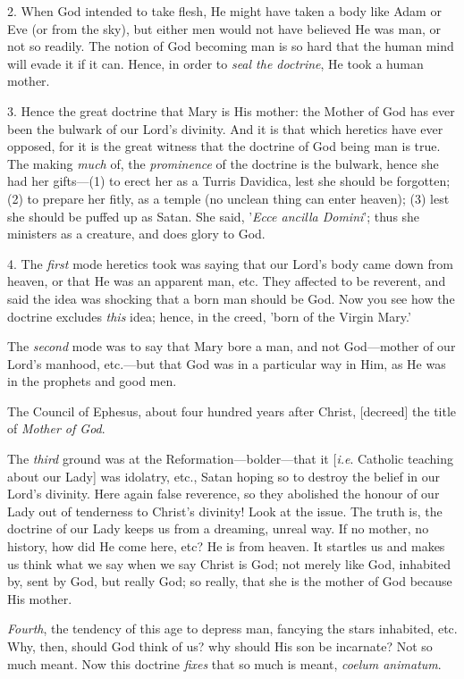 2. When God intended to take flesh, He might have
taken a body like Adam or Eve (or from the sky), but either men would
not have believed He was man, or not so readily. The notion of God
becoming man is so hard that the human mind will evade it if it can.
Hence, in order to \emph{seal the doctrine}, He took a human mother.

3. Hence the great doctrine that Mary is His
mother: the Mother of God has ever been the bulwark of our Lord's
divinity. And it is that which heretics have ever opposed, for it is
the great witness that the doctrine of God being man is true. The
making \emph{much} of, the \emph{prominence} of the doctrine is the
bulwark, hence she had her gifts—(1) to erect her as a Turris
Davidica, lest she should be forgotten; (2) to prepare her fitly, as a
temple (no unclean thing can enter heaven); (3) lest she should be
puffed up as Satan. She said, '\emph{Ecce ancilla Domini}'; thus she
ministers as a creature, and does glory to God.

4. The \emph{first} mode heretics took was saying
that our Lord's body came down from heaven, or that He was an apparent
man, etc. They affected to be reverent, and said the idea was shocking
that a born man should be God. Now you see how the doctrine excludes \emph{this}
idea; hence, in the creed, 'born of the Virgin Mary.'

The \emph{second} mode was to say that Mary bore
a man, and not God—mother of our Lord's manhood, etc.—but that God
was in a particular way in Him, as He was in the prophets and good
men.

The Council of Ephesus, about four hundred years
after Christ, [decreed] the title of \emph{Mother of God}.

The \emph{third} ground was at the
Reformation—bolder—that it [\emph{i.e}. Catholic teaching about
our Lady] was idolatry, etc., Satan hoping so to destroy the belief in
our Lord's divinity. Here again false reverence, so they abolished the
honour of our Lady out of tenderness to Christ's divinity! Look at the
issue. The truth is, the doctrine of our Lady keeps us from a
dreaming, unreal way. If no mother, no history, how did He come here,
etc? He is from heaven. It startles us and makes us think what we say
when we say Christ is God; not merely like God, inhabited by, sent by
God, but really God; so really, that she is the mother of God because
His mother.

\emph{Fourth}, the tendency of this age to
depress man, fancying the stars inhabited, etc. Why, then, should God
think of us? why should His son be incarnate? Not so much meant. Now
this doctrine \emph{fixes} that so much is meant, \emph{coelum animatum}.

